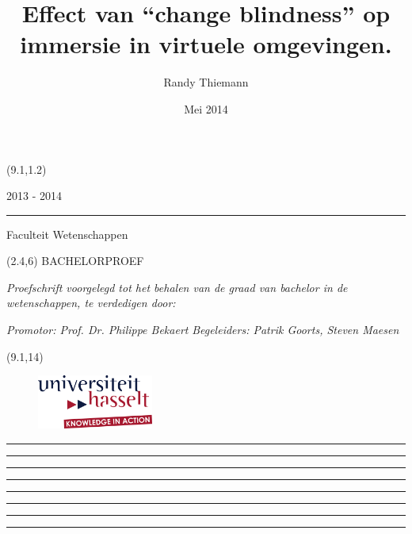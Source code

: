 \documentclass[a4paper,12pt]{report}
\title{Effect van ``change blindness'' op immersie in virtuele omgevingen.}  \let\Title\@title
\author{Randy Thiemann}                        \let\Author\@author
\date{Mei 2014}
\begin{document}
\thispagestyle{empty}
\begin{textblock}{7}(9.1,1.2)
    {\color{uhasselttext} 2013 - 2014 \rule{0.2mm}{2.1mm} }{\color{uhasseltblue} Faculteit Wetenschappen}
\end{textblock}
\begin{textblock}{6.5}(2.4,6)
    \vspace*{1.5cm}
    {\Large\noindent\color{uhasselttext} BACHELORPROEF}\newline
    \vspace{1.5cm}

    {\noindent\LARGE\bf\color{uhasseltblue} \Title}\newline
    \vspace{1.7cm}
    
    {\small\color{uhasselttext}\noindent\it Proefschrift voorgelegd tot het behalen van de graad van bachelor in de wetenschappen, te verdedigen door:}\newline

    {\noindent\color{uhasselttext}\bf \Author}\newline
    
    {\small\noindent\color{uhasselttext}\it Promotor: Prof. Dr. Philippe Bekaert}\newline
    {\small\noindent\color{uhasselttext}\it Begeleiders: Patrik Goorts, Steven Maesen}
    \vspace{1.5cm}
\end{textblock}
\begin{textblock}{6.5}(9.1,14)
    \begin{figure}[ht]
        \centering
        \includegraphics[width=1.5in]{logo_uhasselt}
    \end{figure}
\end{textblock}
\hspace*{4cm}
{\color{uhasseltred}\rule{0.4mm}{\paperheight}}
\hspace{0.28cm}
{\color{uhasseltred}\rule{0.4mm}{\paperheight}}
\hspace{0.015cm}
{\color{uhasseltred}\rule{0.4mm}{\paperheight}}
\hspace{0.015cm}
{\color{uhasseltred}\rule{0.4mm}{\paperheight}}
\hspace{0.52525cm}
{\color{uhasseltred}\rule{0.4mm}{\paperheight}}
\hspace{0.30cm}
{\color{uhasseltred}\rule{0.4mm}{\paperheight}}
\hspace{0.36cm}
{\color{uhasseltred}\rule{0.4mm}{\paperheight}}
\hspace{0.015cm}
{\color{uhasseltred}\rule{0.4mm}{\paperheight}}
\newpage
\restoregeometry
\end{document}
